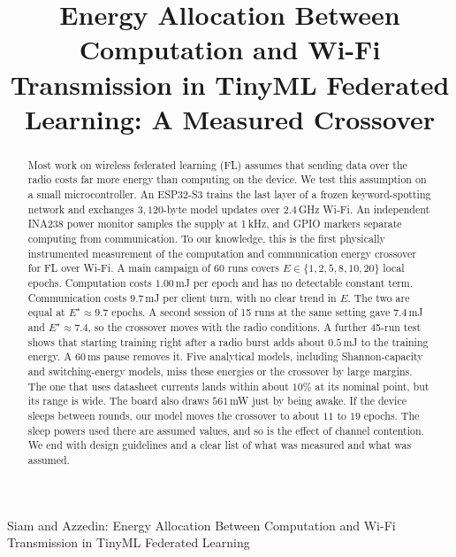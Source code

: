 \documentclass[journal]{IEEEtran}
\begin{document}
\title{Energy Allocation Between Computation and Wi-Fi Transmission in TinyML Federated Learning: A Measured Crossover}

\author{
}

%
{Siam and Azzedin: Energy Allocation Between Computation and Wi-Fi Transmission in TinyML Federated Learning}

\maketitle

\begin{abstract}
Most work on wireless federated learning (FL) assumes that sending data over the radio costs far more energy than computing on the device. We test this assumption on a small microcontroller. An ESP32-S3 trains the last layer of a frozen keyword-spotting network and exchanges $3{,}120$-byte model updates over 2.4\,GHz Wi-Fi. An independent INA238 power monitor samples the supply at 1\,kHz, and GPIO markers separate computing from communication. To our knowledge, this is the first physically instrumented measurement of the computation and communication energy crossover for FL over Wi-Fi. A main campaign of 60 runs covers $E\in\{1,2,5,8,10,20\}$ local epochs. Computation costs $1.00$\,mJ per epoch and has no detectable constant term. Communication costs $9.7$\,mJ per client turn, with no clear trend in $E$. The two are equal at $E^\star\approx9.7$ epochs. A second session of 15 runs at the same setting gave $7.4$\,mJ and $E^\star\approx7.4$, so the crossover moves with the radio conditions. A further 45-run test shows that starting training right after a radio burst adds about $0.5$\,mJ to the training energy. A $60$\,ms pause removes it. Five analytical models, including Shannon-capacity and switching-energy models, miss these energies or the crossover by large margins. The one that uses datasheet currents lands within about $10\%$ at its nominal point, but its range is wide. The board also draws $561$\,mW just by being awake. If the device sleeps between rounds, our model moves the crossover to about $11$ to $19$ epochs. The sleep powers used there are assumed values, and so is the effect of channel contention. We end with design guidelines and a clear list of what was measured and what was assumed.
\end{abstract}
\end{document}
